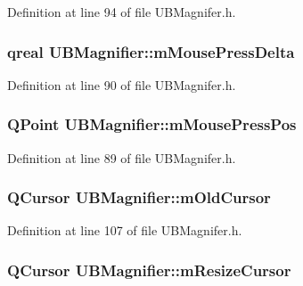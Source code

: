 Definition at line 94 of file U\-B\-Magnifer.\-h.

\hypertarget{class_u_b_magnifier_a19c3c1f51c99c0b2cfd9e77b9591af9c}{
\subsubsection[{m\-Mouse\-Press\-Delta}]{\setlength{\rightskip}{0pt plus 5cm}qreal U\-B\-Magnifier\-::m\-Mouse\-Press\-Delta\hspace{0.3cm}{\ttfamily [protected]}}}\label{d4/d9d/class_u_b_magnifier_a19c3c1f51c99c0b2cfd9e77b9591af9c}


Definition at line 90 of file U\-B\-Magnifer.\-h.

\hypertarget{class_u_b_magnifier_a01af5513e2d3fbc5eaad21dfc58ae4ba}{
\subsubsection[{m\-Mouse\-Press\-Pos}]{\setlength{\rightskip}{0pt plus 5cm}Q\-Point U\-B\-Magnifier\-::m\-Mouse\-Press\-Pos\hspace{0.3cm}{\ttfamily [protected]}}}\label{d4/d9d/class_u_b_magnifier_a01af5513e2d3fbc5eaad21dfc58ae4ba}


Definition at line 89 of file U\-B\-Magnifer.\-h.

\hypertarget{class_u_b_magnifier_a60c46f6fa233df7c20933b68855781d8}{
\subsubsection[{m\-Old\-Cursor}]{\setlength{\rightskip}{0pt plus 5cm}Q\-Cursor U\-B\-Magnifier\-::m\-Old\-Cursor\hspace{0.3cm}{\ttfamily [protected]}}}\label{d4/d9d/class_u_b_magnifier_a60c46f6fa233df7c20933b68855781d8}


Definition at line 107 of file U\-B\-Magnifer.\-h.

\hypertarget{class_u_b_magnifier_aa9896755efd6a80ade87f0581bdfe629}{
\subsubsection[{m\-Resize\-Cursor}]{\setlength{\rightskip}{0pt plus 5cm}Q\-Cursor U\-B\-Magnifier\-::m\-Resize\-Cursor\hspace{0.3cm}{\ttfamily [protected]}}}\label{d4/d9d/class_u_b_magnifier_aa9896755efd6a80ade87f0581bdfe629}


